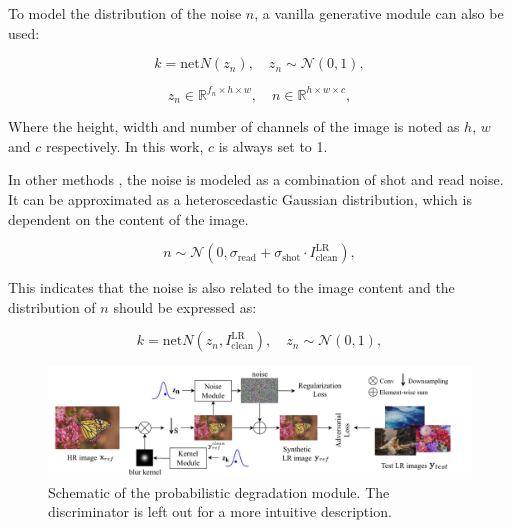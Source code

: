     
    To model the distribution of the noise $n$, a vanilla generative module can also be used:

    \begin{equation}
        k = \text{net}N(z_n), \quad z_n \sim \mathcal{N}(0,1),
    \end{equation}

    \begin{equation}
        z_n \in \mathbb{R}^{f_n \times h \times w}, \quad n \in \mathbb{R}^{h \times w \times c},
    \end{equation}

    Where the height, width and number of channels of the image is noted as $h$, $w$ and $c$ respectively. 
    In this work, $c$ is always set to 1.

    In other methods \cite{plotz2017benchmarking}, the noise is modeled as a combination of shot and read noise. 
    It can be approximated as a heteroscedastic Gaussian distribution, which is dependent on the content of the image.

    \begin{equation}
        n \sim \mathcal{N}(0, \sigma_{\text{read}} + \sigma_{\text{shot}} \cdot I^{\text{LR}}_{\text{clean}}),
    \end{equation}

    This indicates that the noise is also related to the image content and the distribution of $n$ should be expressed as:


    \begin{equation}
        k = \text{net}N(z_n,I^{\text{LR}}_{\text{clean}}), \quad z_n \sim \mathcal{N}(0,1),
    \end{equation}

    \begin{figure}[h!]
        \centering
        \includegraphics[width=\textwidth]{Includes/3-probabilistic-degradation-model.png}
        \caption{Schematic of the probabilistic degradation module.
                The discriminator is left out for a more intuitive description.}
        \label{fig:3-probabilistic-degradation-model}
    \end{figure}

